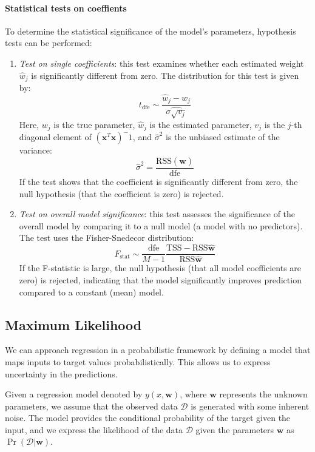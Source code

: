 \paragraph*{Statistical tests on coeffients}
To determine the statistical significance of the model's parameters, hypothesis tests can be performed:
\begin{enumerate}
    \item \textit{Test on single coefficients}: this test examines whether each estimated weight $\hat{w}_j$ is significantly different from zero.
        The distribution for this test is given by:
        \[t_{\text{dfe}}\sim\dfrac{\hat{w}_j-w_j}{\hat{\sigma\sqrt{v_j}}}\]
        Here, $w_j$ is the true parameter, $\hat{w}_j$ is the estimated parameter, $v_j$ is the $j$-th diagonal element of $(\mathbf{x}^T\mathbf{x})^-1$, and $\hat{\sigma}^2$ is the unbiased estimate of the variance:
        \[\hat{\sigma}^2=\dfrac{\text{RSS}(\hat{\mathbf{w}})}{\text{dfe}}\]
        If the test shows that the coefficient is significantly different from zero, the null hypothesis (that the coefficient is zero) is rejected.
    \item \textit{Test on overall model significance}: this test assesses the significance of the overall model by comparing it to a null model (a model with no predictors).
        The test uses the Fisher-Snedecor distribution:
        \[F_\text{stat}\sim\dfrac{\text{dfe}}{M-1}\dfrac{\text{TSS}-\text{RSS}\hat{\mathbf{w}}}{\text{RSS}\hat{\mathbf{w}}}\]  
        If the F-statistic is large, the null hypothesis (that all model coefficients are zero) is rejected, indicating that the model significantly improves prediction compared to a constant (mean) model.
\end{enumerate}

\subsection{Maximum Likelihood}
We can approach regression in a probabilistic framework by defining a model that maps inputs to target values probabilistically. This allows us to express uncertainty in the predictions.

Given a regression model denoted by $y(x, \mathbf{w})$, where $\mathbf{w}$ represents the unknown parameters, we assume that the observed data $\mathcal{D}$ is generated with some inherent noise.
The model provides the conditional probability of the target given the input, and we express the likelihood of the data $\mathcal{D}$ given the parameters $\mathbf{w}$ as $\Pr(\mathcal{D}|\mathbf{w})$. 

